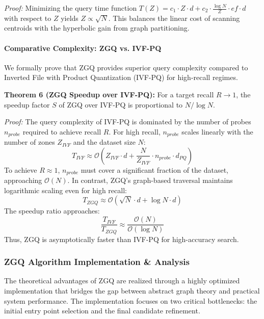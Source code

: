 \documentclass[conference]{IEEEtran}
\begin{document}
\textit{Proof:} Minimizing the query time function $T(Z) = c_1 \cdot Z \cdot d + c_2 \cdot \frac{\log N}{Z} \cdot ef \cdot d$ with respect to $Z$ yields $Z \propto \sqrt{N}$. This balances the linear cost of scanning centroids with the hyperbolic gain from graph partitioning.

\paragraph{Comparative Complexity: ZGQ vs. IVF-PQ}
We formally prove that ZGQ provides superior query complexity compared to Inverted File with Product Quantization (IVF-PQ) for high-recall regimes.

\textbf{Theorem 6 (ZGQ Speedup over IVF-PQ):} For a target recall $R \to 1$, the speedup factor $S$ of ZGQ over IVF-PQ is proportional to $N / \log N$.

\textit{Proof:}
The query complexity of IVF-PQ is dominated by the number of probes $n_{probe}$ required to achieve recall $R$. For high recall, $n_{probe}$ scales linearly with the number of zones $Z_{IVF}$ and the dataset size $N$:
\begin{equation}
T_{IVF} \approx \mathcal{O}(Z_{IVF} \cdot d + \frac{N}{Z_{IVF}} \cdot n_{probe} \cdot d_{PQ})
\end{equation}
To achieve $R \approx 1$, $n_{probe}$ must cover a significant fraction of the dataset, approaching $\mathcal{O}(N)$.
In contrast, ZGQ's graph-based traversal maintains logarithmic scaling even for high recall:
\begin{equation}
T_{ZGQ} \approx \mathcal{O}(\sqrt{N} \cdot d + \log N \cdot d)
\end{equation}
The speedup ratio approaches:
\begin{equation}
\frac{T_{IVF}}{T_{ZGQ}} \approx \frac{\mathcal{O}(N)}{\mathcal{O}(\log N)}
\end{equation}
Thus, ZGQ is asymptotically faster than IVF-PQ for high-accuracy search.

\subsubsection{ZGQ Algorithm Implementation \& Analysis}

The theoretical advantages of ZGQ are realized through a highly optimized implementation that bridges the gap between abstract graph theory and practical system performance. The implementation focuses on two critical bottlenecks: the initial entry point selection and the final candidate refinement.
\end{document}

